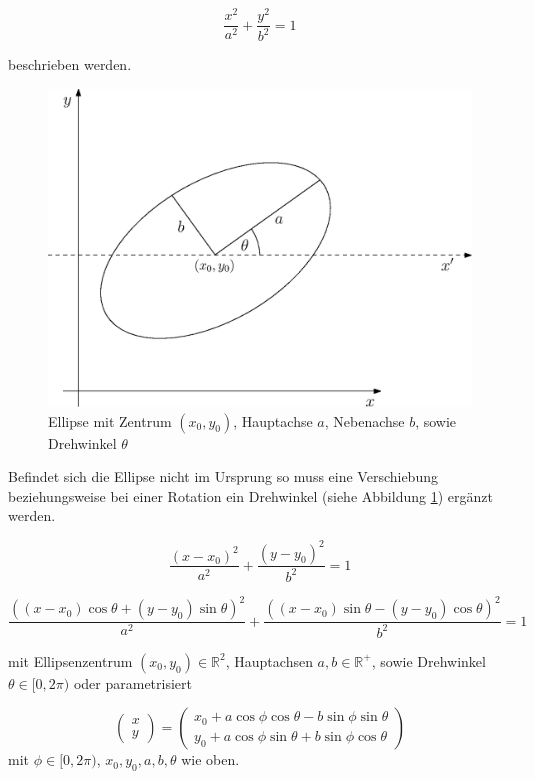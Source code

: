 \begin{equation} \label{eq:ellipseNoRotNoTrans}
\frac{x^2}{a^2} + \frac{y^2}{b^2} = 1
\end{equation} 

beschrieben werden.

\begin{figure}[!htb]
	\centering
	\includegraphics[scale=.7]{images/ellipse.eps}
	\caption{Ellipse mit Zentrum $(x_0, y_0)$, Hauptachse $a$, Nebenachse $b$, sowie Drehwinkel $\theta$}
	\label{fig:ellipse}
\end{figure}

Befindet sich die Ellipse nicht im Ursprung so muss eine Verschiebung beziehungsweise bei einer Rotation ein Drehwinkel (siehe Abbildung \ref{fig:ellipse}) ergänzt werden. 

\begin{equation} \label{eq:ellipseNoRotTrans}
\frac{\left(x-x_0\right)^2}{a^2} + \frac{\left(y-y_0\right)^2}{b^2} = 1
\end{equation} 

\begin{equation} \label{eq:ellipseRotTrans}
\frac{((x - x_0)\cos\theta + (y - y_0)\sin\theta)^2}{a^2} + \frac{((x - x_0)\sin\theta - (y - y_0)\cos\theta)^2}{b^2} = 1
\end{equation} 

mit Ellipsenzentrum $(x_0,y_0)\in\mathbb{R}^2$, Hauptachsen $a,b\in\mathbb{R}^+$, sowie Drehwinkel $\theta \in [0,2\pi)$ oder parametrisiert

\begin{equation} \label{eq:ellipseRotTransParam}
\begin{pmatrix}x \\ y\end{pmatrix} = \begin{pmatrix}x_0 + a\cos\phi\cos\theta - b\sin\phi\sin\theta \\ 
y_0 + a\cos\phi\sin\theta + b\sin\phi\cos\theta\end{pmatrix}
\end{equation}
mit $\phi \in [0, 2\pi)$, $x_0, y_0, a,b, \theta$ wie oben.

